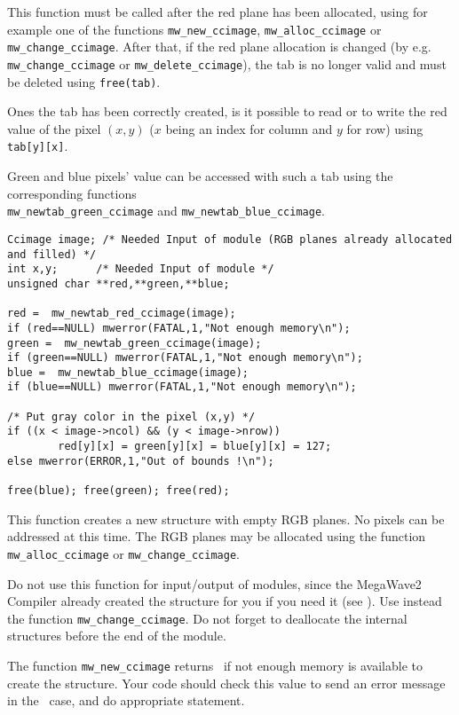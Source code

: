 This function must be called after the red plane has been allocated,
using for example one of the functions \verb+mw_new_ccimage+, 
\verb+mw_alloc_ccimage+ or \verb+mw_change_ccimage+. 
After that, if the red plane allocation is changed
(by e.g. \verb+mw_change_ccimage+ or \verb+mw_delete_ccimage+), the tab is
no longer valid and must be deleted using \verb+free(tab)+.

Ones the tab has been correctly created, is it possible to read or to
write the red value of the pixel $(x,y)$ ($x$ being an index for column and $y$
for row) using \verb+tab[y][x]+.

Green and blue pixels' value can be accessed with such a tab using 
the corresponding functions \\
\verb+mw_newtab_green_ccimage+ and \verb+mw_newtab_blue_ccimage+.

\Next
\Example
\begin{verbatim}
Ccimage image; /* Needed Input of module (RGB planes already allocated and filled) */
int x,y;      /* Needed Input of module */
unsigned char **red,**green,**blue;

red =  mw_newtab_red_ccimage(image);
if (red==NULL) mwerror(FATAL,1,"Not enough memory\n");
green =  mw_newtab_green_ccimage(image);
if (green==NULL) mwerror(FATAL,1,"Not enough memory\n");
blue =  mw_newtab_blue_ccimage(image);
if (blue==NULL) mwerror(FATAL,1,"Not enough memory\n");

/* Put gray color in the pixel (x,y) */
if ((x < image->ncol) && (y < image->nrow)) 
        red[y][x] = green[y][x] = blue[y][x] = 127;
else mwerror(ERROR,1,"Out of bounds !\n");

free(blue); free(green); free(red);
\end{verbatim}

\newpage %
\Description
This function creates a new \ccimage structure with empty RGB planes.
No pixels can be addressed at this time.
The RGB planes may be allocated using the function \verb+mw_alloc_ccimage+ or
\verb+mw_change_ccimage+.

Do not use this function for input/output of modules, since the MegaWave2
Compiler already created the structure for you if you need it (see \volI). Use instead the function \verb+mw_change_ccimage+.
Do not forget to deallocate the internal structures before the end
of the module.

The function \verb+mw_new_ccimage+ returns \Null\ if not enough memory is available to create the structure. Your code should check this value to send an
error message in the \Null\ case, and do appropriate statement.

